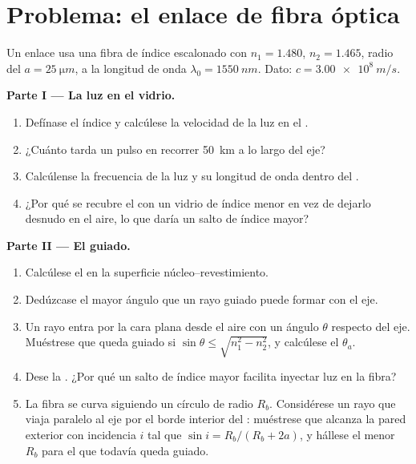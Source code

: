 \section{Problema: el enlace de fibra óptica}

\begin{problem}
\label{pb:b1:rays-reflection-refraction:1}
Un enlace usa una fibra de índice escalonado con  $n_1 = 1.480$,
 $n_2 = 1.465$, radio del  $a = \qty{25}{\micro m}$, a
la longitud de onda $\lambda_0 = \qty{1550}{nm}$. Dato:
$c = \qty{3.00e8}{m/s}$.

\medskip
\noindent\textbf{Parte I --- La luz en el vidrio.}
\begin{enumerate}
  \item Defínase el índice y calcúlese la velocidad de la luz en el
        .
  \item ¿Cuánto tarda un pulso en recorrer \qty{50}{km} a lo largo del
        eje?
  \item Calcúlense la frecuencia de la luz y su longitud de onda dentro
        del .
  \item ¿Por qué se recubre el  con un vidrio de índice menor en vez
        de dejarlo desnudo en el aire, lo que daría un salto de índice
        mayor?
\end{enumerate}

\medskip
\noindent\textbf{Parte II --- El guiado.}
\begin{enumerate}[resume]
  \item Calcúlese el  en la superficie núcleo--revestimiento.
  \item Dedúzcase el mayor ángulo que un rayo guiado puede formar con el
        eje.
  \item Un rayo entra por la cara plana desde el aire con un ángulo
        $\theta$ respecto del eje. Muéstrese que queda guiado si
        $\sin\theta \leq
        \sqrt{n_1^2 - n_2^2}$, y calcúlese el 
        $\theta_a$.
  \item Dese la . ¿Por qué un salto de índice mayor
        facilita inyectar luz en la fibra?
  \item La fibra se curva siguiendo un círculo de radio $R_b$. Considérese
        un rayo que viaja paralelo al eje por el borde interior del
        : muéstrese que alcanza la pared exterior con incidencia $i$
        tal que $\sin i = R_b/(R_b + 2a)$, y hállese el menor $R_b$ para
        el que todavía queda guiado.
\end{enumerate}


\end{problem}
